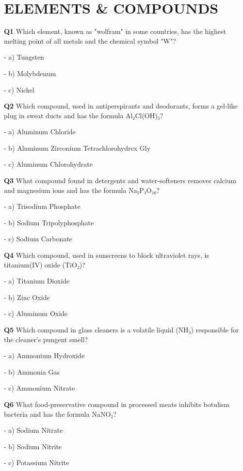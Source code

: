 \section{ELEMENTS & COMPOUNDS}

\textbf{Q1} Which element, known as "wolfram" in some countries, has the highest melting point of all metals and the chemical symbol "W"?\par
\quad - a) Tungsten\par
\quad - b) Molybdenum\par
\quad - c) Nickel\par

\textbf{Q2} Which compound, used in antiperspirants and deodorants, forms a gel‑like plug in sweat ducts and has the formula Al₂Cl(OH)₅?\par
\quad - a) Aluminum Chloride\par
\quad - b) Aluminum Zirconium Tetrachlorohydrex Gly\par
\quad - c) Aluminum Chlorohydrate\par

\textbf{Q3} What compound found in detergents and water‑softeners removes calcium and magnesium ions and has the formula Na₅P₃O₁₀?\par
\quad - a) Trisodium Phosphate\par
\quad - b) Sodium Tripolyphosphate\par
\quad - c) Sodium Carbonate\par

\textbf{Q4} Which compound, used in sunscreens to block ultraviolet rays, is titanium(IV) oxide (TiO₂)?\par
\quad - a) Titanium Dioxide\par
\quad - b) Zinc Oxide\par
\quad - c) Aluminum Oxide\par

\textbf{Q5} Which compound in glass cleaners is a volatile liquid (NH₃) responsible for the cleaner's pungent smell?\par
\quad - a) Ammonium Hydroxide\par
\quad - b) Ammonia Gas\par
\quad - c) Ammonium Nitrate\par

\textbf{Q6} What food‑preservative compound in processed meats inhibits botulism bacteria and has the formula NaNO₂?\par
\quad - a) Sodium Nitrate\par
\quad - b) Sodium Nitrite\par
\quad - c) Potassium Nitrite\par

